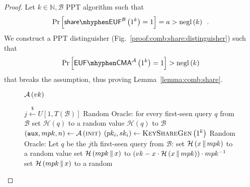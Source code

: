     \begin{proof}
      Let $k \in \mathbb{N}, \mathcal{B}$ PPT algorithm such that
      \begin{equation*}
        \Pr\left[\mathsf{share \mhyphen EUF}^{\mathcal{B}}\left(1^k\right) =
        1\right] = a > \mathrm{negl}\left(k\right) \enspace.
      \end{equation*}
      We construct a PPT distinguisher \adversary{}
      (Fig.~\ref{proof:comb:share:distinguisher}) such that
      \begin{equation*}
        \Pr\left[\mathsf{EUF \mhyphen CMA}^{\adversary}\left(1^k\right) =
        1\right] > \mathrm{negl}\left(k\right)
      \end{equation*}
      that breaks the assumption, thus proving Lemma~\ref{lemma:comb:share}.

      \begin{figure}[H]
        \begin{algobox}{$\mathcal{A}\left(vk\right)$}
          \begin{algorithmic}[1]
            \State $j \overset{\$}{\gets} U\left[1,
            T\left(\mathcal{B}\right)\right]$
            \Indent
              \State Random Oracle: for every first-seen query $q$ from
              $\mathcal{B}$ set $\mathcal{H}\left(q\right)$ to a random value
              \State \Return $\mathcal{H}\left(q\right)$ to $\mathcal{B}$
            \EndIndent
            \State $\left(\mathtt{aux}, mpk, n\right) \gets
            \mathcal{A}\left(\textsc{init}\right)$
              \State $\left(pk_i, sk_i\right) \gets
              \textsc{KeyShareGen}\left(1^k\right)$
            \EndFor
            \Indent
              \State Random Oracle: Let $q$ be the $j$th first-seen query from
              $\mathcal{B}$:
              \label{proof:comb:share:ro:start}
                  \State set $\mathcal{H}\left(x \,\|\, mpk\right)$ to a random
                  value
                \EndIf
                \State set $\mathcal{H}\left(mpk \,\|\, x\right)$ to $\left(vk
                - x \cdot \mathcal{H}\left(x \,\|\, mpk\right)\right) \cdot
                mpk^{-1}$
                  \State set $\mathcal{H}\left(mpk \,\|\, x\right)$ to a random

\end{algorithmic}
\end{algobox}
\end{figure}
\end{proof}
